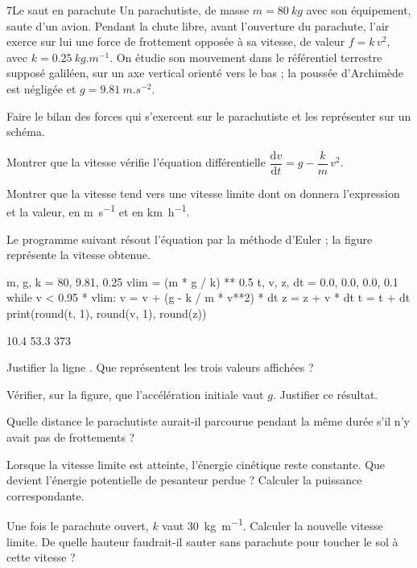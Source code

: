 \begin{exoBac}{7}{Le saut en parachute}
Un parachutiste, de masse $m=\qty{80}{kg}$ avec son équipement, saute d'un avion. Pendant la chute libre, avant l'ouverture du
parachute, l'air exerce sur lui une force de frottement opposée à sa vitesse, de valeur $f=k\,v^2$, avec $k=\qty{0,25}{kg.m^{-1}}$.
On étudie son mouvement dans le référentiel terrestre supposé galiléen, sur un axe vertical orienté vers le bas ; la
poussée d'Archimède est négligée et $g=\qty{9,81}{m.s^{-2}}$.
\begin{questions}
\item Faire le bilan des forces qui s'exercent sur le parachutiste et les représenter sur un schéma.
\item Montrer que la vitesse vérifie l'équation différentielle $\dfrac{\mathrm{d}v}{\mathrm{d}t}=g-\dfrac{k}{m}\,v^2$.
\item Montrer que la vitesse tend vers une vitesse limite dont on donnera l'expression et la valeur, en \unit{m.s^{-1}} et en
\unit{km.h^{-1}}.
\item {}Le programme suivant résout l'équation par la méthode d'Euler ; la figure représente la vitesse
obtenue.
\begin{codecote}[0.62]
\begin{pythoncol}
m, g, k = 80, 9.81, 0.25
vlim = (m * g / k) ** 0.5
t, v, z, dt = 0.0, 0.0, 0.0, 0.1
while v < 0.95 * vlim:
    v = v + (g - k / m * v**2) * dt
    z = z + v * dt
    t = t + dt
print(round(t, 1), round(v, 1), round(z))
\end{pythoncol}
\cote
\begin{consolecol}
10.4 53.3 373
\end{consolecol}
\end{codecote}
Justifier la ligne . Que représentent les trois valeurs affichées ?
\item Vérifier, sur la figure, que l'accélération initiale vaut $g$. Justifier ce résultat.
\item Quelle distance le parachutiste aurait-il parcourue pendant la même durée s'il n'y avait pas de frottements ?
\item Lorsque la vitesse limite est atteinte, l'énergie cinétique reste constante. Que devient l'énergie potentielle de
pesanteur perdue ? Calculer la puissance correspondante.
\item \initiative Une fois le parachute ouvert, $k$ vaut \qty{30}{kg.m^{-1}}. Calculer la nouvelle vitesse limite. De quelle hauteur
faudrait-il sauter sans parachute pour toucher le sol à cette vitesse ?
\end{questions}
\end{exoBac}

